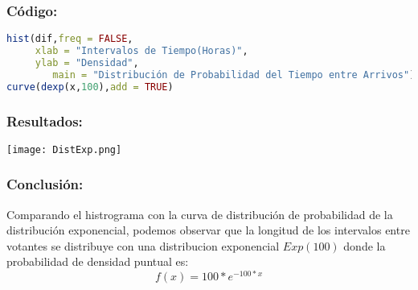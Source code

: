 \documentclass{article}
\begin{document}
\begin{enumerate}[(a)]
\subsubsection*{Código:}
\begin{lstlisting}[language=R]
hist(dif,freq = FALSE,
     xlab = "Intervalos de Tiempo(Horas)", 
     ylab = "Densidad",
        main = "Distribución de Probabilidad del Tiempo entre Arrivos")
curve(dexp(x,100),add = TRUE)
\end{lstlisting}

\subsubsection*{Resultados:}
\texttt{[image: DistExp.png]}

\subsubsection*{Conclusión:}
Comparando el histrograma con la curva de distribución de probabilidad de la distribución exponencial, podemos observar que la longitud de los intervalos entre votantes se distribuye con una distribucion exponencial $Exp(100)$ donde la probabilidad de densidad puntual es: $$f(x) = 100*e^{-100 * x}$$


\end{enumerate}
\end{document}
